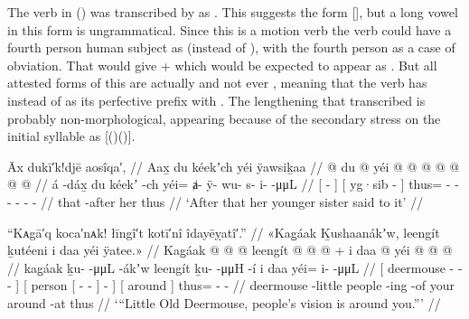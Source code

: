 The verb  in (\lastx) was transcribed by \citeauthor{swanton:1909} as .
This suggests the form  [], but a long vowel in this form is ungrammatical.
Since this is a motion verb the verb could have a fourth person human subject as  (instead of ), with the fourth person as a case of obviation.
That would give  +  which would be expected to appear as .
But all attested forms of this are actually  and not ever , meaning that the verb has  instead of  as its perfective prefix with .
The lengthening that \citeauthor{swanton:1909} transcribed is probably non-morphological, appearing because of the secondary stress on the initial syllable as [()()].

\ex\label{ex:92-64-yg-sister-says-to-it}%
%
\begingl
	\glpreamble	Āx dukī′k!djē aosîqa′, //
	\glpreamble	Aax̱ du kéekʼch yéi ÿawsiḵaa //
	\gla	{}  @ {} {} {} du  @ {} {}
		yéi @  @ {} @ {} @ {} @ {} @ {} @ {} //
	\glb	{} á -dáx̱ {} {} du kéekʼ -ch {}
		yéi= ⱥ- ÿ- wu- s- i-  -μμL //
	\glc	{}[  - {}] {}[  yg·sib - {}]
		thus= - - - - -
			 - //
	\gld	{} that -after {} {} her  {} {}
		thus  {} {} {} {} {} {} //
	\glft	‘After that her younger sister said to it’
		//
\endgl
\xe

\ex\label{ex:92-65-peoples-vision-around-you}%
%
\begingl
	\glpreamble	“Kᴀgā′q koca′nᴀk! łīngî′t kotī′nî îdayēỵatî′.” //
	\glpreamble	«\!Kag̱áak Ḵushaanákʼw, leengít ḵutéeni i daa yéi ÿatee.\!» //
	\gla	{} Kag̱áak  @ {} @ {} @ {} {}
		{} leengít {}  @ {} @ {} @ {} {} {} {} +
		{} i daa @ {} {} 
		yéi @  @ {} @ {} //
	\glb	{} kag̱áak ḵu-  -μμL -ákʼw {} 
		{} leengít {} ḵu-  -μμH\qquad\hspace{0.75ex} {} {} -í {}
		{} i daa {} {}
		yéi= i-  -μμL //
	\glc	{}[ deermouse -  - - {}]
		{}[ person {}[ -
			 - \· {}] - {}]
		{}[  around \· {}]
		thus= -  - //
	\gld	{} deermouse  {} {} -little {}
		{} people {}  {} {} -ing {} -of {}
		{} your around -at {}
		thus  {} {} //
	\glft	‘“Little Old Deermouse, people’s vision is around you.”’
		//
\endgl
\xe

